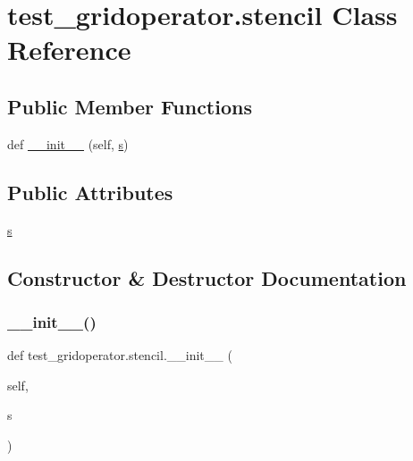 \hypertarget{classtest__gridoperator_1_1stencil}{}\section{test\+\_\+gridoperator.\+stencil Class Reference}
\label{classtest__gridoperator_1_1stencil}
\subsection*{Public Member Functions}
\begin{DoxyCompactItemize}
\item 
def \hyperlink{classtest__gridoperator_1_1stencil_a90c31f0bd275f3274121ddbc37456921}{\+\_\+\+\_\+init\+\_\+\+\_\+} (self, \hyperlink{classtest__gridoperator_1_1stencil_af300df4225356588e4b16700ad69a05b}{s})
\end{DoxyCompactItemize}
\subsection*{Public Attributes}
\begin{DoxyCompactItemize}
\item 
\hyperlink{classtest__gridoperator_1_1stencil_af300df4225356588e4b16700ad69a05b}{s}
\end{DoxyCompactItemize}


\subsection{Constructor \& Destructor Documentation}
\mbox{\label{classtest__gridoperator_1_1stencil_a90c31f0bd275f3274121ddbc37456921}} 
\subsubsection{\texorpdfstring{\+\_\+\+\_\+init\+\_\+\+\_\+()}{\_\_init\_\_()}}
{\footnotesize\ttfamily def test\+\_\+gridoperator.\+stencil.\+\_\+\+\_\+init\+\_\+\+\_\+ (\begin{DoxyParamCaption}\item[{}]{self,  }\item[{}]{s }\end{DoxyParamCaption})}



